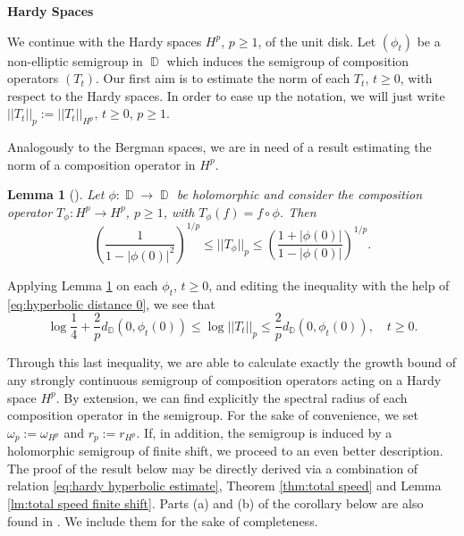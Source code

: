 \documentclass[11pt]{amsart}
\numberwithin{equation}{section}
\newcommand{\hiddennumberedsubsection}[1]{%
	\refstepcounter{subsection}%
	\subsectionmark{#1}%
	\noindent\textbf{\thesubsection\quad #1}%
}
\newtheorem{lemma}[theorem]{Lemma}
\theoremstyle{definition}
\DeclareMathOperator{\D}{\mathbb{D}}
\begin{document}
	\hiddennumberedsubsection{Hardy Spaces}
	
	We continue with the Hardy spaces $H^p$, $p\ge1$, of the unit disk. Let $(\phi_t)$ be a non-elliptic semigroup in $\D$ which induces the semigroup of composition operators $(T_t)$. Our first aim is to estimate the norm of each $T_t$, $t\ge0$, with respect to the Hardy spaces. In order to ease up the notation, we will just write $||T_t||_p:=||T_t||_{H^p}$, $t\ge0$, $p\ge1$.
	
	Analogously to the Bergman spaces, we are in need of a result estimating the norm of a composition operator in $H^p$. 
	
	
	\begin{lemma}[{\cite[Corollary 3.7]{Cowen-Maccluer}}]\label{lm:hardy estimate}
		Let $\phi:\D\to\D$ be holomorphic and consider the composition operator $T_\phi:H^p\to H^p$, $p\ge1$, with $T_\phi(f)=f\circ\phi$. Then
		\begin{equation*}
			\left(\dfrac{1}{1-|\phi(0)|^2}\right)^{1/p} \le ||T_\phi||_p \le \left(\dfrac{1+|\phi(0)|}{1-|\phi(0)|}\right)^{1/p}.
		\end{equation*}
	\end{lemma}
	Applying Lemma \ref{lm:hardy estimate} on each $\phi_t$, $t\ge0$, and editing the inequality with the help of \eqref{eq:hyperbolic distance 0}, we see that
	\begin{equation}\label{eq:hardy hyperbolic estimate}
		\log\dfrac{1}{4}+\frac{2}{p}d_{\D}(0,\phi_t(0)) \le \log||T_t||_p \le \frac{2}{p}d_{\D}(0,\phi_t(0)), \quad t\ge0.
	\end{equation}
	
	Through this last inequality, we are able to calculate exactly the growth bound of any strongly continuous semigroup of composition operators acting on a Hardy space $H^p$. By extension, we can find explicitly the spectral radius of each composition operator in the semigroup. For the sake of convenience, we set $\omega_p:=\omega_{H^p}$ and $r_p:=r_{H^p}$. 
	If, in addition, the semigroup is induced by a holomorphic semigroup of finite shift, we proceed to an even better description. The proof of the result below may be directly derived via a combination of relation \eqref{eq:hardy hyperbolic estimate}, Theorem \ref{thm:total speed} and Lemma \ref{lm:total speed finite shift}. Parts (a) and (b) of the corollary below are also found in \cite[Theorem 3.9]{Cowen-Maccluer}. We include them for the sake of completeness.
	
\end{document}
